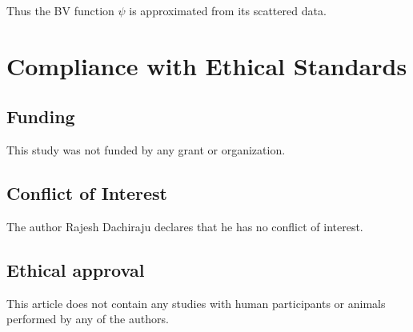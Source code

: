 \documentclass[multixcb]{amstext-l}
\theoremstyle{plain}
\theoremstyle{definition}
\theoremstyle{definition}
\theoremstyle{remark}
\numberwithin{equation}{chapter}
\begin{document}
 Thus the BV function $\psi$ is approximated from its scattered data.

\section{Compliance with Ethical Standards}

\subsection{Funding}
This study was not funded by any grant or organization.
\subsection{Conflict of Interest}
The author Rajesh Dachiraju declares that he has no conflict of interest.
\subsection{Ethical approval}
This article does not contain any studies with human participants or animals performed by any of the authors.


\end{document}
